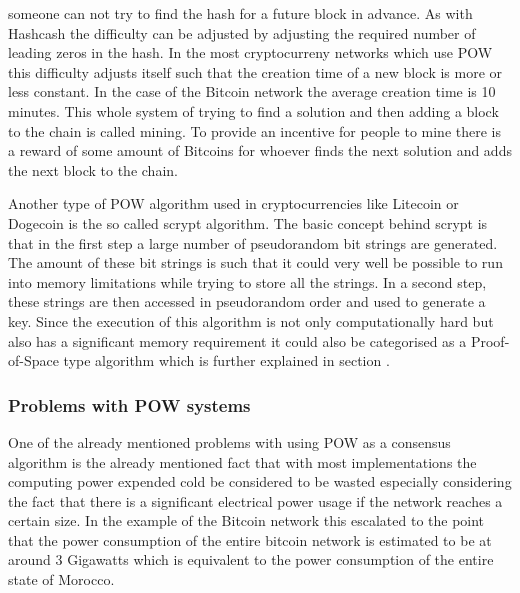 someone can not try to find the hash for a future block in advance. As with Hashcash the difficulty can be adjusted by adjusting the required number
of leading zeros in the hash. In the most cryptocurreny networks which use POW this difficulty adjusts itself such that the creation time of a new block is more or less constant. In the case
of the Bitcoin network the average creation time is 10 minutes.
This whole system of trying to find a solution and then adding a block to the chain is called mining. To provide an incentive for
people to mine there is a reward of some amount of Bitcoins for whoever finds the next solution and adds the next block to the chain.\cite{url:bitcoin}\par
Another type of POW algorithm used in cryptocurrencies like Litecoin or Dogecoin is the so called scrypt algorithm.\cite{url:litecoin_dogecoin} The basic concept behind scrypt is that in the first 
step a large number of pseudorandom bit strings are generated. The amount of these bit strings is such that it could very well be possible to run into memory limitations while trying to store 
all the strings. In a second step, these strings are then accessed in pseudorandom order and used to generate a key. Since the execution of this algorithm is not only computationally hard but
also has a significant memory requirement it could also be categorised as a Proof-of-Space type algorithm\cite{url:scrypt} which is further explained in section .

\subsubsection{Problems with POW systems}

One of the already mentioned problems with using POW as a consensus algorithm is the already mentioned fact that with most implementations the computing power expended cold be considered
to be wasted especially considering the fact that there is a significant electrical power usage if the network reaches a certain size. In the example of the Bitcoin network this escalated to
the point that the power consumption of the entire bitcoin network is estimated to be at around 3 Gigawatts which is equivalent to the power consumption of the entire state of Morocco.\cite{url:btc_power}

